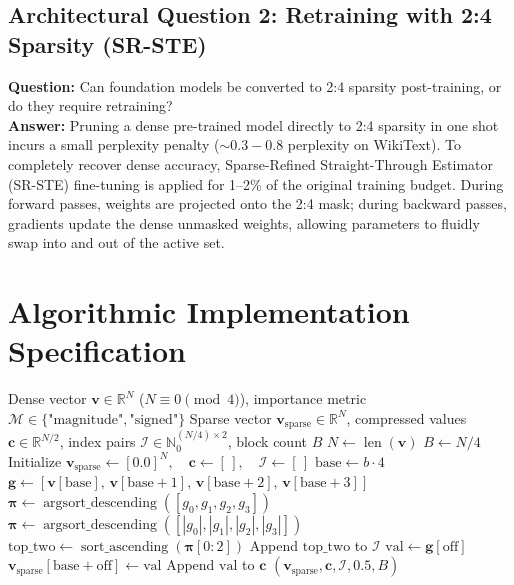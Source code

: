 \documentclass[11pt,a4paper]{article}
\theoremstyle{definition}
\begin{document}
\subsection{Architectural Question 2: Retraining with 2:4 Sparsity (SR-STE)}
\textbf{Question:} Can foundation models be converted to 2:4 sparsity post-training, or do they require retraining?\\
\textbf{Answer:} Pruning a dense pre-trained model directly to 2:4 sparsity in one shot incurs a small perplexity penalty ($\sim 0.3 - 0.8$ perplexity on WikiText). To completely recover dense accuracy, Sparse-Refined Straight-Through Estimator (SR-STE) fine-tuning is applied for 1--2\% of the original training budget. During forward passes, weights are projected onto the 2:4 mask; during backward passes, gradients update the dense unmasked weights, allowing parameters to fluidly swap into and out of the active set.

\section{Algorithmic Implementation Specification}

\begin{algorithm}[H]
\caption{Semi-Structured 2:4 Fine-Grained Sparsity Projection}
\begin{algorithmic}[1]
\Require Dense vector $\mathbf{v} \in \mathbb{R}^N$ ($N \equiv 0 \pmod 4$), importance metric $\mathcal{M} \in \{\text{"magnitude"}, \text{"signed"}\}$
\Ensure Sparse vector $\mathbf{v}_{\text{sparse}} \in \mathbb{R}^N$, compressed values $\mathbf{c} \in \mathbb{R}^{N/2}$, index pairs $\mathcal{I} \in \mathbb{N}_0^{(N/4) \times 2}$, block count $B$
\State $N \gets \operatorname{len}(\mathbf{v})$
\State $B \gets N / 4$
\State Initialize $\mathbf{v}_{\text{sparse}} \gets [0.0]^N, \quad \mathbf{c} \gets [\,], \quad \mathcal{I} \gets [\,]$
    \State $\text{base} \gets b \cdot 4$
    \State $\mathbf{g} \gets [ \mathbf{v}[\text{base}], \, \mathbf{v}[\text{base}+1], \, \mathbf{v}[\text{base}+2], \, \mathbf{v}[\text{base}+3] ]$
        \State $\boldsymbol{\pi} \gets \operatorname{argsort\_descending}([ g_0, g_1, g_2, g_3 ])$
    \Else
        \State $\boldsymbol{\pi} \gets \operatorname{argsort\_descending}([ |g_0|, |g_1|, |g_2|, |g_3| ])$
    \EndIf
    \State $\text{top\_two} \gets \operatorname{sort\_ascending}(\boldsymbol{\pi}[0 : 2])$
    \State Append $\text{top\_two}$ to $\mathcal{I}$
        \State $\text{val} \gets \mathbf{g}[\text{off}]$
        \State $\mathbf{v}_{\text{sparse}}[\text{base} + \text{off}] \gets \text{val}$
        \State Append $\text{val}$ to $\mathbf{c}$
    \EndFor
\EndFor
\State \Return $(\mathbf{v}_{\text{sparse}}, \mathbf{c}, \mathcal{I}, 0.5, B)$
\end{algorithmic}
\end{algorithm}
\end{document}
